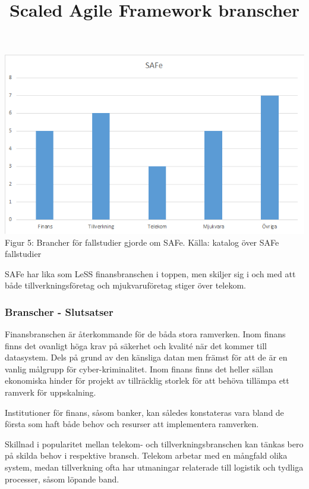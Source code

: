 				
			\title{Scaled Agile Framework branscher}
			\begin{center}
				\includegraphics{Grafer/SAFe_brancher.png}
				\\ Figur 5: Brancher för fallstudier gjorde om SAFe. Källa: katalog över SAFe fallstudier \cite{safe_casestudies}
			\end{center}
					
			SAFe har lika som LeSS finansbranschen i toppen, men skiljer sig i och med att både tillverkningsföretag och mjukvaruföretag stiger över telekom.
			
		\subsubsection{Branscher - Slutsatser}
		
			Finansbranschen är återkommande för de båda stora ramverken. Inom finans finns det ovanligt höga krav på säkerhet och kvalité när det kommer till datasystem. Dels på grund av den känsliga datan men främst för att de är en vanlig målgrupp för cyber-kriminalitet. Inom finans finns det heller sällan ekonomiska hinder för projekt av tillräcklig storlek för att behöva tillämpa ett ramverk för uppskalning. 
			
			Institutioner för finans, såsom banker, kan således konstateras vara bland de första som haft både behov och resurser att implementera ramverken.
			
			
			Skillnad i popularitet mellan telekom- och tillverkningsbranschen kan tänkas bero på skilda behov i respektive bransch. Telekom arbetar med en mångfald olika system, medan tillverkning ofta har utmaningar relaterade till logistik och tydliga processer, såsom löpande band.
			
	

